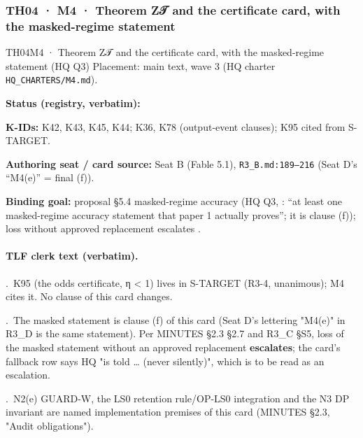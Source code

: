 \subsubsection{TH04 · M4 · Theorem Z𝒯 and the certificate card, with the masked-regime statement}\label{sec:th04}
\begin{card}{TH04}{M4 · Theorem Z𝒯 and the certificate card, with the masked-regime statement (HQ Q3)}
\approvedFB\quad Placement: main text, wave 3 (HQ charter \texttt{HQ\_CHARTERS/M4.md}).\par
\textbf{Status (registry, verbatim):} \par
\textbf{K-IDs:} K42, K43, K45, K44; K36, K78 (output-event clauses); K95 cited from S-TARGET.\par
\textbf{Authoring seat / card source:} Seat B (Fable 5.1), \texttt{R3\_B.md:189–216} (Seat D's ``M4(e)'' = final (f)).\par
\textbf{Binding goal:} proposal §5.4 masked-regime accuracy (HQ Q3, : ``at least one masked-regime accuracy statement that paper 1 actually proves''; it is clause (f)); loss without approved replacement escalates .
\end{card}

\paragraph{TLF clerk text (verbatim).}
\par{}.~K95 (the odds certificate, η \textless{} 1) lives in S-TARGET (R3-4, unanimous); M4 cites it. No clause of this card changes.
\par{}.~The masked statement is clause (f) of this card (Seat D's lettering "M4(e)" in R3\_D is the same statement). Per MINUTES §2.3 §2.7 and R3\_C §S5, loss of the masked statement without an approved replacement \textbf{escalates}; the card's fallback row says HQ "is told … (never silently)", which is to be read as an escalation.
\par{}.~N2(e) GUARD-W, the LS0 retention rule/OP-LS0 integration and the N3 DP invariant are named implementation premises of this card (MINUTES §2.3, "Audit obligations").

